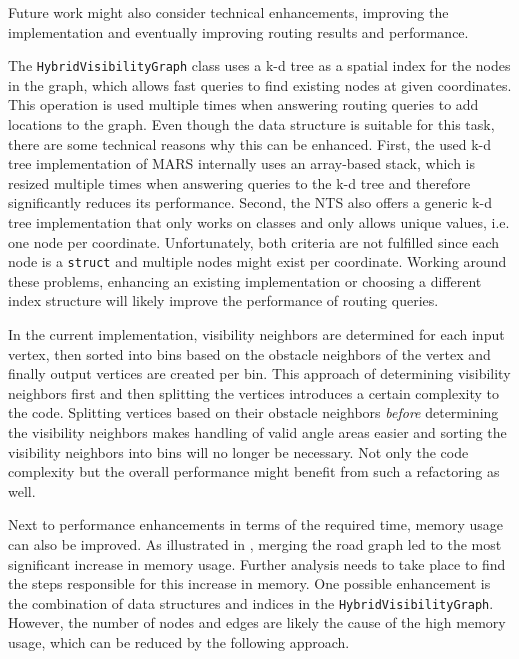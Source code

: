 		Future work might also consider technical enhancements, improving the implementation and eventually improving routing results and performance.
	
		The \texttt{HybridVisibilityGraph} class uses a k-d tree as a spatial index for the nodes in the graph, which allows fast queries to find existing nodes at given coordinates.
		This operation is used multiple times when answering routing queries to add locations to the graph.
		Even though the data structure is suitable for this task, there are some technical reasons why this can be enhanced.
		First, the used k-d tree implementation of MARS internally uses an array-based stack, which is resized multiple times when answering queries to the k-d tree and therefore significantly reduces its performance.
		Second, the NTS also offers a generic k-d tree implementation that only works on classes and only allows unique values, i.e. one node per coordinate.
		Unfortunately, both criteria are not fulfilled since each node is a \texttt{struct} and multiple nodes might exist per coordinate.
		Working around these problems, enhancing an existing implementation or choosing a different index structure will likely improve the performance of routing queries.
		
		In the current implementation, visibility neighbors are determined for each input vertex, then sorted into bins based on the obstacle neighbors of the vertex and finally output vertices are created per bin.
		This approach of determining visibility neighbors first and then splitting the vertices introduces a certain complexity to the code.
		Splitting vertices based on their obstacle neighbors \emph{before} determining the visibility neighbors makes handling of valid angle areas easier and sorting the visibility neighbors into bins will no longer be necessary.
		Not only the code complexity but the overall performance might benefit from such a refactoring as well.
		
		Next to performance enhancements in terms of the required time, memory usage can also be improved.
		As illustrated in , merging the road graph led to the most significant increase in memory usage.
		Further analysis needs to take place to find the steps responsible for this increase in memory.
		One possible enhancement is the combination of data structures and indices in the \texttt{HybridVisibilityGraph}.
		However, the number of nodes and edges are likely the cause of the high memory usage, which can be reduced by the following approach.
		
